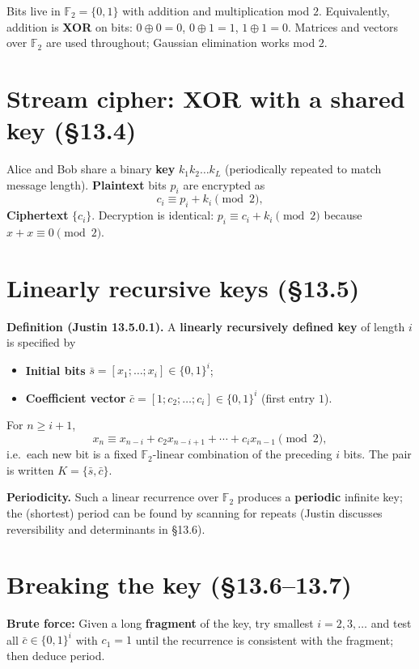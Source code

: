 Bits live in $\mathbb{F}_2=\{0,1\}$ with addition and multiplication mod $2$. Equivalently, addition is \textbf{XOR} on bits: $0\oplus 0=0$, $0\oplus 1=1$, $1\oplus 1=0$. Matrices and vectors over $\mathbb{F}_2$ are used throughout; Gaussian elimination works mod $2$.

\section{Stream cipher: XOR with a shared key (\S13.4)}

Alice and Bob share a binary \textbf{key} $k_1k_2\ldots k_L$ (periodically repeated to match message length). \textbf{Plaintext} bits $p_i$ are encrypted as
\[
c_i \equiv p_i + k_i \pmod 2,
\]
\textbf{Ciphertext} $\{c_i\}$. Decryption is identical: $p_i\equiv c_i+k_i\pmod 2$ because $x+x\equiv 0\pmod 2$.

\section{Linearly recursive keys (\S13.5)}

\textbf{Definition (Justin 13.5.0.1).} A \textbf{linearly recursively defined key} of length $i$ is specified by
\begin{itemize}[nosep]
  \item \textbf{Initial bits} $\bar{s}=[x_1;\ldots;x_i]\in\{0,1\}^i$;
  \item \textbf{Coefficient vector} $\bar{c}=[1;c_2;\ldots;c_i]\in\{0,1\}^i$ (first entry $1$).
\end{itemize}
For $n\ge i+1$,
\[
x_n \equiv x_{n-i} + c_2 x_{n-i+1} + \cdots + c_i x_{n-1} \pmod 2,
\]
i.e.\ each new bit is a fixed $\mathbb{F}_2$-linear combination of the preceding $i$ bits. The pair is written $K=\{\bar{s},\bar{c}\}$.

\textbf{Periodicity.} Such a linear recurrence over $\mathbb{F}_2$ produces a \textbf{periodic} infinite key; the (shortest) period can be found by scanning for repeats (Justin discusses reversibility and determinants in \S13.6).

\section{Breaking the key (\S13.6--13.7)}

\textbf{Brute force:} Given a long \textbf{fragment} of the key, try smallest $i=2,3,\ldots$ and test all $\bar{c}\in\{0,1\}^i$ with $c_1=1$ until the recurrence is consistent with the fragment; then deduce period.

